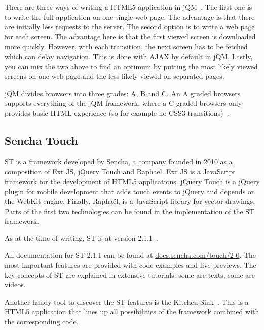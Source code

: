 \documentclass[a4paper]{artikel3}
\newcommand{\exturl}[1]{\href{http://#1}{#1}}
\newcommand{\setspace}[0]{\vspace{2mm}}
\renewcommand{\paragraph}[1]{\setspace \noindent {\bf #1}  }
\begin{document}
There are three ways of writing a HTML5 application in jQM~\cite{Broulik2012}. 
The first one is to write the full application on one single web page.
The advantage is that there are initially less requests to the server.
The second option is to write a web page for each screen. 
The advantage here is that the first viewed screen is downloaded more quickly. 
However, with each transition, the next screen has to be fetched which can delay navigation.
This is done with AJAX by default in jQM.
Lastly, you can mix the two above to find an optimum by putting the most likely viewed screens on one web page and the less likely viewed on separated pages.  

\paragraph{Browser support}
\label{sec:jqm-browser-support}
jQM divides browsers into three grades: A, B and C. 
An A graded browsers supports everything of the jQM framework, where a C graded browsers only provides basic HTML experience (so for example no CSS3 transitions)~\cite{JQuery2012d}.

\subsection{Sencha Touch} %
\label{sec:sencha_touch}

ST is a framework developed by Sencha,  a company founded in 2010 as a composition of Ext JS, jQuery Touch and Raphaël.  
Ext JS is a JavaScript framework for the development of HTML5 applications.  
jQuery Touch is a jQuery plugin for mobile development that adds touch events to jQuery and depends on the WebKit engine.  
Finally,  Raphaël, is a JavaScript library for vector drawings.  
Parts of the first two technologies can be found in the implementation of the ST framework.    

As at the time of writing,  ST is at version 2.1.1~\cite{Inc.}.

\paragraph{Documentation}
All documentation for ST 2.1.1 can be found at \exturl{docs.sencha.com/touch/2-0}.  
The most important features are provided with code examples and live previews.
The key concepts of ST are explained in extensive tutorials:  some are texts, some are videos.  

Another handy tool to discover the ST features is the Kitchen Sink~\cite{Inc.2013}.  
This is a HTML5 application that lines up all possibilities of the framework combined with the corresponding code.
\end{document}
